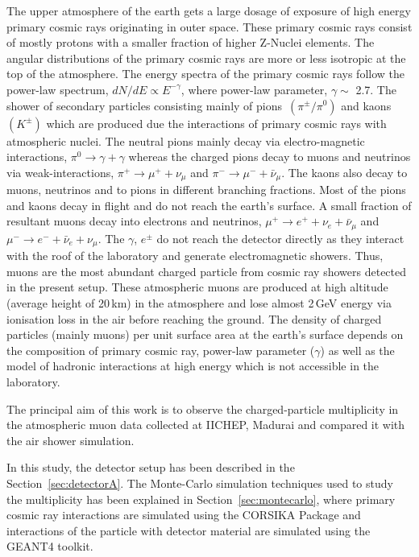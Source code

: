 The upper atmosphere of the earth gets a large dosage of exposure of
high energy primary cosmic rays originating in outer space. These
primary cosmic rays consist of mostly protons with a smaller fraction
of higher \mbox{Z-Nuclei} elements\cite{cosmic1}. The angular
distributions of the primary cosmic rays are more or less isotropic
at the top of the atmosphere. The energy spectra of the primary
cosmic rays follow the power-law spectrum, $dN/dE \propto E^{-\gamma}$,
where power-law parameter, $\gamma \sim $ 2.7. The shower of secondary
particles consisting mainly of
\mbox{pions $\left(\pi^{\pm}/\pi^0\right)$} and
\mbox{kaons $\left(K^{\pm}\right)$} which are produced due the
interactions of primary cosmic rays with atmospheric nuclei.
The neutral pions mainly decay via electro-magnetic interactions,
$\pi^0 \rightarrow \gamma+\gamma$ whereas the charged pions decay to
muons and neutrinos via weak-interactions,
$\pi^+ \rightarrow \mu^+ + \nu_{\mu}$ and
$\pi^- \rightarrow \mu^- + \bar{\nu}_{\mu}$. The kaons also decay to
muons, neutrinos and to pions in different branching fractions.
Most of the pions and kaons decay in flight and do not reach the
earth's surface.
 A small fraction of resultant muons decay into
electrons and neutrinos, 
$\mu^+ \rightarrow e^+ + \nu_{e} + \bar{\nu}_{\mu}$ and 
$\mu^- \rightarrow e^- + \bar{\nu}_{e} + \nu_{\mu}$. 
The $\gamma$, $e^{\pm}$ do not reach the detector directly as they
interact with the roof of the laboratory and generate electromagnetic
showers.
Thus, muons are the
most abundant charged particle from cosmic ray showers detected in the
present setup. These atmospheric muons are produced at high altitude
(average height of 20\,km) in the atmosphere and lose almost 2\,GeV
energy via ionisation loss in the air before reaching the ground. The 
density of charged particles (mainly muons) per unit surface area at
the earth's surface depends on the composition of primary cosmic ray,
power-law parameter ($\gamma$) as well as the model of hadronic
interactions at high energy which is not accessible in the laboratory.

The principal aim of this work is to observe the charged-particle
multiplicity in the atmospheric muon data collected
at IICHEP, Madurai and compared it with the air shower simulation.

In this study, the detector setup has been described in
the Section~\ref{sec:detectorA}. The Monte-Carlo simulation techniques
used to study the multiplicity has been explained in
Section~\ref{sec:montecarlo}, where primary cosmic ray interactions
are simulated using the CORSIKA Package\cite{corsika763} and
interactions of the particle with detector material are simulated
using the GEANT4 toolkit\cite{geant4}.


